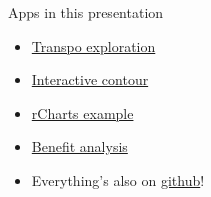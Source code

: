 \documentclass[sans,aspectratio=169,presentation,bigger,fleqn]{beamer}
\begin{document}
\begin{frame}[label=sec-30]{Apps in this presentation}
\begin{itemize}
\item \href{https://jwhendy.shinyapps.io/transpo-exploration/}{Transpo exploration}
\item \href{http://spark.rstudio.com/jwhendy/interactive-contour/}{Interactive contour}
\item \href{https://jwhendy.shinyapps.io/shiny-rcharts/}{rCharts example}
\item \href{http://spark.rstudio.com/jwhendy/insurance-visualizer/}{Benefit analysis}
\item Everything's also on \href{https://github.com/jwhendy/devFest-shiny}{github}!
\end{itemize}
\end{frame}
\end{document}
